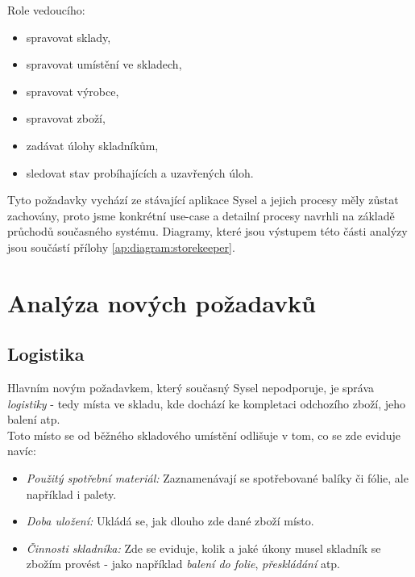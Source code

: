 Role vedoucího:
\begin{itemize}
	\item spravovat sklady,
	\item spravovat umístění ve skladech,
	\item spravovat výrobce,
	\item spravovat zboží,
	\item zadávat úlohy skladníkům,
	\item sledovat stav probíhajících a uzavřených úloh.
\end{itemize}

Tyto požadavky vychází ze stávající aplikace Sysel a jejich procesy měly zůstat zachovány, proto jsme konkrétní use-case a detailní procesy navrhli na základě průchodů současného systému. Diagramy, které jsou výstupem této části analýzy jsou součástí přílohy \ref{ap:diagram:storekeeper}.


\section{Analýza nových požadavků}

\subsection{Logistika}

Hlavním novým požadavkem, který současný Sysel nepodporuje, je správa \emph{logistiky} - tedy místa ve skladu, kde dochází ke kompletaci odchozího zboží, jeho balení atp.\\
Toto místo se od běžného skladového umístění odlišuje v tom, co se zde eviduje navíc:
\begin{itemize}
	\item \emph{Použitý spotřební materiál:} Zaznamenávají se spotřebované balíky či fólie, ale například i palety.
	\item \emph{Doba uložení:} Ukládá se, jak dlouho zde dané zboží  místo.
	\item \emph{Činnosti skladníka:} Zde se eviduje, kolik a jaké úkony musel skladník se zbožím provést - jako například \emph{balení do folie}, \emph{přeskládání} atp.
\end{itemize}

